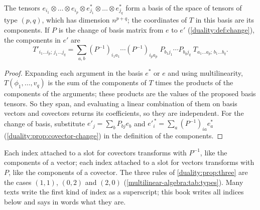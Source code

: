 \begin{notechapter}
\begin{theorem}[Components]\label{multilinear-algebra:thm:components}
The tensors
$e_{i_1}\otimes\dots\otimes e_{i_p}\otimes
e_{j_1}^*\otimes\dots\otimes e_{j_q}^*$
form a basis of the space of tensors of type $(p, q)$, which has
dimension $n^{p+q}$; the coordinates of $T$ in this basis are its
components. If $P$ is the change of basis matrix from $e$ to $e'$
(\cref{duality:def:change}), the components in $e'$ are
\[
  T'_{i_1\dots i_p;\,j_1\dots j_q}
  = \sum_{a, b}(P^{-1})_{i_1a_1}\cdots(P^{-1})_{i_pa_p}\;
    P_{b_1j_1}\cdots P_{b_qj_q}\;T_{a_1\dots a_p;\,b_1\dots b_q} .
\]
\end{theorem}

\begin{proof}
Expanding each argument in the basis $e^*$ or $e$ and using
multilinearity, $T(\phi_1,\dots,v_q)$ is the sum of the components of
$T$ times the products of the components of the arguments; these
products are the values of the proposed basis tensors. So they span,
and evaluating a linear combination of them on basis vectors and
covectors returns its coefficients, so they are independent. For the
change of basis, substitute $e'_j = \sum_bP_{bj}e_b$ and
$e'^{\,*}_i = \sum_a(P^{-1})_{ia}e_a^*$
(\cref{duality:prop:covector-change}) in the definition of the
components.
\end{proof}

\begin{keyidea}
Each index attached to a slot for covectors transforms with $P^{-1}$,
like the components of a vector; each index attached to a slot for
vectors transforms with $P$, like the components of a covector. The
three rules of \cref{duality:prop:three} are the cases $(1, 1)$,
$(0, 2)$ and $(2, 0)$ (\cref{multilinear-algebra:tab:types}). Many
texts write the first kind of index as a superscript; this book writes
all indices below and says in words what they are.
\end{keyidea}


\end{notechapter}
